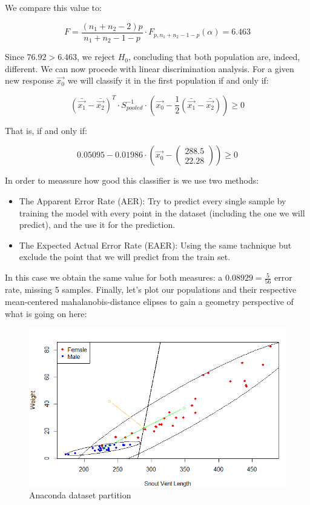 \documentclass[11pt,a4paper]{article}
\begin{document}
	We compare this value to:
	
	$$ F = \frac{(n_1 + n_2 - 2)p}{n_1+n_2-1-p} \cdot F_{p, n_1+n_2-1-p}(\alpha) = 6.463 $$
	
	Since $76.92 > 6.463$, we reject $H_0$, concluding that both population are, indeed, different. We can now procede with linear discrimination analysis. For a given new response $\vec{x_0}$ we will classify it in the first population if and only if:
	
	$$ (\bar{\vec{x_1}} - \bar{\vec{x_2}})^T \cdot S_{pooled}^{-1} \cdot (\vec{x_0} - \frac{1}{2}(\bar{\vec{x_1}} - \bar{\vec{x_2}})) \ge 0 $$
	
	That is, if and only if:
	
	$$ 0.05095 - 0.01986 \cdot (\vec{x_0} - \begin{pmatrix}
	288.5 \\
	22.28
	\end{pmatrix} ) \ge 0 $$
	
	In order to meassure how good this classifier is we use two methods:
	
	\begin{itemize}
		\item The Apparent Error Rate (AER): Try to predict every single sample by training the model with every point in the dataset (including the one we will predict), and the use it for the prediction.
		\item The Expected Actual Error Rate (EAER): Using the same tachnique but exclude the point that we will predict from the train set.
	\end{itemize}

	In this case we obtain the same value for both measures: a $0.08929 = \frac{5}{56}$ error rate, missing 5 samples. Finally, let's plot our populations and their respective mean-centered mahalanobis-distance elipses to gain a geometry perspective of what is going on here:
	
	\begin{figure}[H] 
		\centering
		\includegraphics[scale=.9]{./pics/LDA}
		\caption{Anaconda dataset partition} \label{anaconda-label}
	\end{figure}
	
\end{document}
